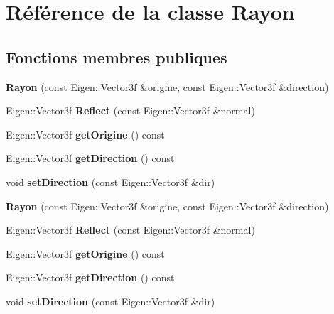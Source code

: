 \hypertarget{class_rayon}{}\section{Référence de la classe Rayon}
\label{class_rayon}
\subsection*{Fonctions membres publiques}
\begin{DoxyCompactItemize}
\item 
\hypertarget{class_rayon_a7bd3d77cf9257f49f071fdb77e906f2a}{}{\bfseries Rayon} (const Eigen\+::\+Vector3f \&origine, const Eigen\+::\+Vector3f \&direction)\label{class_rayon_a7bd3d77cf9257f49f071fdb77e906f2a}

\item 
\hypertarget{class_rayon_a022a008c4afc2fa050e60a3d3d04c938}{}Eigen\+::\+Vector3f {\bfseries Reflect} (const Eigen\+::\+Vector3f \&normal)\label{class_rayon_a022a008c4afc2fa050e60a3d3d04c938}

\item 
\hypertarget{class_rayon_a8f71b0c28e99a0f150bae1a654030adb}{}Eigen\+::\+Vector3f {\bfseries get\+Origine} () const \label{class_rayon_a8f71b0c28e99a0f150bae1a654030adb}

\item 
\hypertarget{class_rayon_aedfd1733249c365f086cf77e556db8e4}{}Eigen\+::\+Vector3f {\bfseries get\+Direction} () const \label{class_rayon_aedfd1733249c365f086cf77e556db8e4}

\item 
\hypertarget{class_rayon_aa2e433a4499bd29ae49fd6816eebb599}{}void {\bfseries set\+Direction} (const Eigen\+::\+Vector3f \&dir)\label{class_rayon_aa2e433a4499bd29ae49fd6816eebb599}

\item 
\hypertarget{class_rayon_a7bd3d77cf9257f49f071fdb77e906f2a}{}{\bfseries Rayon} (const Eigen\+::\+Vector3f \&origine, const Eigen\+::\+Vector3f \&direction)\label{class_rayon_a7bd3d77cf9257f49f071fdb77e906f2a}

\item 
\hypertarget{class_rayon_a022a008c4afc2fa050e60a3d3d04c938}{}Eigen\+::\+Vector3f {\bfseries Reflect} (const Eigen\+::\+Vector3f \&normal)\label{class_rayon_a022a008c4afc2fa050e60a3d3d04c938}

\item 
\hypertarget{class_rayon_a8f71b0c28e99a0f150bae1a654030adb}{}Eigen\+::\+Vector3f {\bfseries get\+Origine} () const \label{class_rayon_a8f71b0c28e99a0f150bae1a654030adb}

\item 
\hypertarget{class_rayon_aedfd1733249c365f086cf77e556db8e4}{}Eigen\+::\+Vector3f {\bfseries get\+Direction} () const \label{class_rayon_aedfd1733249c365f086cf77e556db8e4}

\item 
\hypertarget{class_rayon_aa2e433a4499bd29ae49fd6816eebb599}{}void {\bfseries set\+Direction} (const Eigen\+::\+Vector3f \&dir)\label{class_rayon_aa2e433a4499bd29ae49fd6816eebb599}

\end{DoxyCompactItemize}
